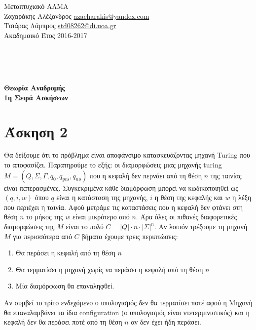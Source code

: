 \documentclass[11pt]{article}
\begin{document}
\noindent\begin{minipage}{\textwidth}

  \begin{minipage}[b]{.6\textwidth}
    \large{
      Μεταπτυχιακό ΑΛΜΑ\\
      Ζαχαράκης Αλέξανδρος \href{mailto:azacharakis@yandex.com}{azacharakis@yandex.com}\\
      Τσιάρας Λάμπρος \href{mailto:std08262@di.uoa.gr}{std08262@di.uoa.gr} \\
      Ακαδημαικό Έτος 2016-2017
    }
    \\
  \end{minipage}

\end{minipage}
\\ \\ \\
\begin{center}
  \textbf{\Large{Θεωρία Αναδρομής}}\\
  \textbf{\Large{1η Σειρά Ασκήσεων}}
\end{center}                


\section*{Άσκηση 2}
Θα δείξουμε ότι το πρόβλημα είναι αποφάνσιμο κατασκευάζοντας μηχανή Turing που το αποφασίζει.
Παρατηρούμε το εξής: οι διαμορφώσεις μιας μηχανής turing $M=(Q,\Sigma,\Gamma,q_0,q_{yes},q_{no})$ 
που η κεφαλή δεν περνάει από τη θέση $n$ της ταινίας είναι πεπερασμένες. Συγκεκριμένα κάθε διαμόρφωση μπορεί
να κωδικοποιηθεί ως $(q,i,w)$ όπου $q$ είναι η κατάσταση της μηχανής, $i$ η θέση της κεφαλής και $w$ η 
λέξη που περιέχει η ταινία.  Αφού μετράμε τις καταστάσεις που η κεφαλή δεν φτάνει στη θέση $n$ το
μήκος της $w$ είναι μικρότερο από $n$.  Άρα όλες οι πιθανές διαφορετικές διαμορφώσεις της $M$ είναι το 
πολύ $C=|Q|\cdot n\cdot |\Sigma|^n$. Αν λοιπόν τρέξουμε τη μηχανή $M$ για περισσότερα από $C$ βήματα
έχουμε τρεις περιπτώσεις: 
\begin{enumerate}
    \item Θα περάσει η κεφαλή από τη θέση $n$
    \item Θα τερματίσει η μηχανή χωρίς να περάσει η κεφαλή από τη θέση $n$
    \item Μία διαμόρφωση θα επαναληφθεί.
\end{enumerate}
Αν συμβεί το τρίτο ενδεχόμενο ο υπολογισμός δεν θα τερματίσει ποτέ αφού η Μηχανή θα επαναλαμβάνει 
τα ίδια configuration (ο υπολογισμός είναι ντετερμινιστικός) και η κεφαλή δεν θα περάσει ποτέ από 
τη θέση $n$ αν δεν έχει ήδη περάσει.
\end{document}
